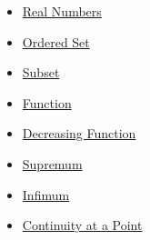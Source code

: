 \begin{dependencies}
\begin{itemize}
  \item \hyperref[def:reals]{Real Numbers}
  \item \hyperref[def:ordered-set]{Ordered Set}
  \item \hyperref[def:subset]{Subset}
  \item \hyperref[def:function]{Function}
  \item \hyperref[def:function-decreasing]{Decreasing Function}
  \item \hyperref[def:supremum]{Supremum}
  \item \hyperref[def:infimum]{Infimum}
  \item \hyperref[def:continuous-at-point]{Continuity at a Point}
\end{itemize}
\end{dependencies}

